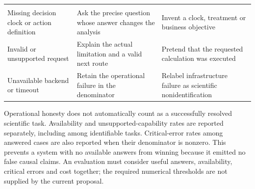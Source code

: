 \begin{longtable}[]{@{}lll@{}}
\begin{minipage}[t]{0.30\columnwidth}
\end{minipage}\tabularnewline
\begin{minipage}[t]{0.30\columnwidth}\raggedright
Missing decision clock or action definition\strut
\end{minipage} & \begin{minipage}[t]{0.30\columnwidth}\raggedright
Ask the precise question whose answer changes the analysis\strut
\end{minipage} & \begin{minipage}[t]{0.30\columnwidth}\raggedright
Invent a clock, treatment or business objective\strut
\end{minipage}\tabularnewline
\begin{minipage}[t]{0.30\columnwidth}\raggedright
Invalid or unsupported request\strut
\end{minipage} & \begin{minipage}[t]{0.30\columnwidth}\raggedright
Explain the actual limitation and a valid next route\strut
\end{minipage} & \begin{minipage}[t]{0.30\columnwidth}\raggedright
Pretend that the requested calculation was executed\strut
\end{minipage}\tabularnewline
\begin{minipage}[t]{0.30\columnwidth}\raggedright
Unavailable backend or timeout\strut
\end{minipage} & \begin{minipage}[t]{0.30\columnwidth}\raggedright
Retain the operational failure in the denominator\strut
\end{minipage} & \begin{minipage}[t]{0.30\columnwidth}\raggedright
Relabel infrastructure failure as scientific nonidentification\strut
\end{minipage}\tabularnewline
\bottomrule
\end{longtable}

Operational honesty does not automatically count as a successfully
resolved scientific task. Availability and unsupported-capability rates
are reported separately, including among identifiable tasks.
Critical-error rates among answered cases are also reported when their
denominator is nonzero. This prevents a system with no available answers
from winning because it emitted no false causal claims. An evaluation must consider useful answers, availability, critical
errors and cost together; the required numerical thresholds are not supplied by the
current proposal.

